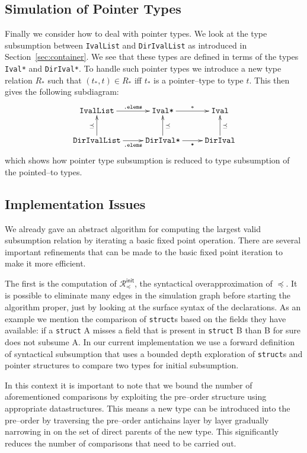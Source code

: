 \documentclass{sigplanconf}
\newcommand{\ms}[1]{\mathsf{#1}}
\newcommand{\mr}[1]{\mathrm{#1}}
\newcommand{\mc}[1]{\mathcal{#1}}
\newcommand{\mt}[1]{\text{\tt #1}}
\begin{document}
\subsection{Simulation of Pointer Types}

Finally we consider how to deal with pointer types. We look at the
type subsumption between \verb+IvalList+ and \verb+DirIvalList+ as
introduced in Section~\ref{sec:container}. We see that these types are
defined in terms of the types \verb+Ival*+ and \verb+DirIval*+. To
handle such pointer types we introduce a new type relation $R_*$ such
that $(t_*, t) \in R_*$ iff $t_*$ is a pointer--type to type $t$. This
then gives the following subdiagram:
\begin{align*}
\xymatrix{
  \mt{IvalList} \ar@{<-}[d]_{\preceq} \ar@{->}[r]^-{\mt{.elems}} 
  & \mt{Ival*} \ar@{<-}[d]^{\preceq} \ar@{->}[r]^-{\mr{*}}
  & \mt{Ival} \ar@{<-}[d]^{\preceq} \\
  \mt{DirIvalList} \ar[r]_-{\mt{.elems}} 
  & \mt{DirIval*} \ar[r]_-{\mt{*}}
  & \mt{DirIval}
}
\end{align*}
which shows how pointer type subsumption is reduced to type
subsumption of the pointed--to types.

\subsection{Implementation Issues}

We already gave an abstract algorithm for
computing the largest valid subsumption relation by iterating a basic
fixed point operation. 
There are several important refinements that can be made to the basic
fixed point iteration to make it more efficient. 

The first is the computation of $\mc{R}^\ms{init}_\preceq$, the syntactical
overapproximation of $\preceq$. It is possible to eliminate many edges
in the simulation graph before starting the algorithm proper, just by
looking at the surface syntax of the declarations. As an example we
mention the comparison of \verb+struct+s based on the fields they have
available: if a \verb+struct+ A misses a field that is present in
\verb+struct+ B than B for sure does not subsume A. In our current
implementation we use a forward definition of syntactical subsumption
that uses a bounded depth exploration of \verb+struct+s and pointer
structures to compare two types for initial subsumption.

In this context it is important to note that we bound the number of
aforementioned comparisons by exploiting the pre--order structure
using appropriate datastructures. This means a new type can be
introduced into the pre--order by traversing the pre--order antichains
layer by layer gradually narrowing in on the set of direct parents of
the new type. This significantly reduces the number of comparisons
that need to be carried out.
\end{document}
